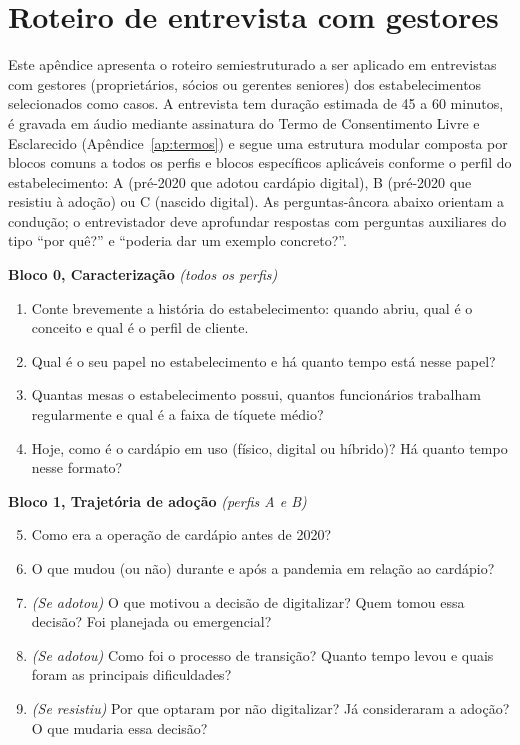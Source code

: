 \chapter{Roteiro de entrevista com gestores}
\label{ap:roteiro}

Este apêndice apresenta o roteiro semiestruturado a ser aplicado em entrevistas com gestores (proprietários, sócios ou gerentes seniores) dos estabelecimentos selecionados como casos. A entrevista tem duração estimada de 45 a 60 minutos, é gravada em áudio mediante assinatura do Termo de Consentimento Livre e Esclarecido (Apêndice~\ref{ap:termos}) e segue uma estrutura modular composta por blocos comuns a todos os perfis e blocos específicos aplicáveis conforme o perfil do estabelecimento: A (pré-2020 que adotou cardápio digital), B (pré-2020 que resistiu à adoção) ou C (nascido digital). As perguntas-âncora abaixo orientam a condução; o entrevistador deve aprofundar respostas com perguntas auxiliares do tipo ``por quê?'' e ``poderia dar um exemplo concreto?''.

\noindent\textbf{Bloco 0, Caracterização} \emph{(todos os perfis)}
\begin{enumerate}
	\item Conte brevemente a história do estabelecimento: quando abriu, qual é o conceito e qual é o perfil de cliente.
	\item Qual é o seu papel no estabelecimento e há quanto tempo está nesse papel?
	\item Quantas mesas o estabelecimento possui, quantos funcionários trabalham regularmente e qual é a faixa de tíquete médio?
	\item Hoje, como é o cardápio em uso (físico, digital ou híbrido)? Há quanto tempo nesse formato?
\end{enumerate}

\noindent\textbf{Bloco 1, Trajetória de adoção} \emph{(perfis A e B)}
\begin{enumerate}\setcounter{enumi}{4}
	\item Como era a operação de cardápio antes de 2020?
	\item O que mudou (ou não) durante e após a pandemia em relação ao cardápio?
	\item \emph{(Se adotou)} O que motivou a decisão de digitalizar? Quem tomou essa decisão? Foi planejada ou emergencial?
	\item \emph{(Se adotou)} Como foi o processo de transição? Quanto tempo levou e quais foram as principais dificuldades?
	\item \emph{(Se resistiu)} Por que optaram por não digitalizar? Já consideraram a adoção? O que mudaria essa decisão?
\end{enumerate}

